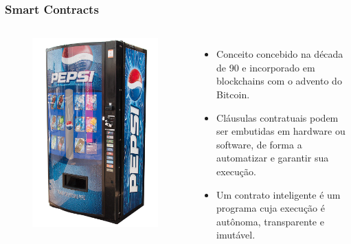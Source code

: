 \documentclass[11pt, red]{beamer}
\begin{document}
\begin{frame}
    \frametitle{Smart Contracts}
    \begin{beamerboxesrounded}[lower=fundocinza,shadow=true]{}
        \begin{columns}
        \scriptsize
        \begin{figure}[htb]
            \begin{center}
                \includegraphics[width=1\linewidth]{fig/vendingmachine.jpg}
            \end{center}
        \end{figure}
            \begin{itemize}
            	\item Conceito concebido na d\'{e}cada de 90 e incorporado em blockchains com o advento do Bitcoin.
                \item Cl\'{a}usulas contratuais podem ser embutidas em hardware ou software, de forma a automatizar e garantir sua execu\c{c}\~{a}o.
                \item Um contrato inteligente \'e um programa cuja execu\c{c}\~ao \'e aut\^onoma, transparente e imut\'avel.
            \end{itemize}
        \end{columns}
    \end{beamerboxesrounded}
\end{frame}
\end{document}
